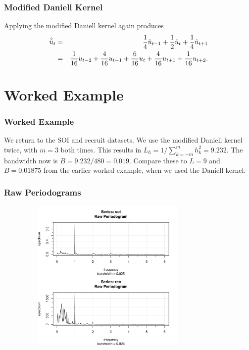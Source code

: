 \documentclass[%
xcolor=pdftex]{beamer}
\begin{document}
\begin{frame}[fragile]
\frametitle{Modified Daniell Kernel}

Applying the modified Daniell kernel again produces
\begin{eqnarray*}
\hat{\hat{u}}_t &=& \frac{1}{4} \hat{u}_{t-1}+\frac{1}{2}
\hat{u}_{t}+\frac{1}{4} \hat{u}_{t+1}\cr
&=&\frac{1}{16} u_{t-2}+\frac{4}{16} u_{t-1}+\frac{6}{16} u_{t}
+\frac{4}{16} u_{t+1}+\frac{1}{16} u_{t+2}.
\end{eqnarray*}


\end{frame}



\section{Worked Example}
\frame{\tableofcontents[currentsection]}

\begin{frame}
\frametitle{Worked Example}

We return to the SOI and recruit datasets. We use the modified Daniell kernel twice, with $m=3$ both times. This results in $L_h = 1/\sum_{k=-m}^{m} h_k^2 = 9.232$. The bandwidth now is $B = 9.232/480 = 0.019$. Compare these to $L=9$ and $B=0.01875$ from the earlier worked example, when we used the Daniell kernel.

\end{frame}

\begin{frame}
\frametitle{Raw Periodograms}

\includegraphics[width=110mm, height=75mm]{periodogram.pdf}

\end{frame}
\end{document}
